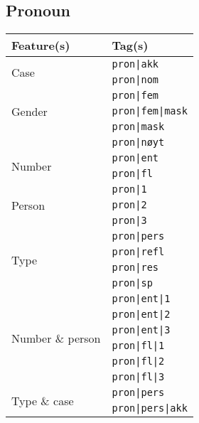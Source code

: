 \documentclass[a4paper,12pt,english]{book}
\begin{document}
\begin{appendices}
    \section{Pronoun}
    \begin{table}
        \centering
        \smaller[1.5]
        \begin{tabular}{@{}ll@{}}
            \toprule
            \textbf{Feature(s)} & \textbf{Tag(s)} \\
            \midrule
            \multirow{2}{*}{Case}
            & \texttt{pron|akk} \\
            & \texttt{pron|nom} \\
            \midrule
            \multirow{3}{*}{Gender}
            & \texttt{pron|fem} \\
            & \texttt{pron|fem|mask} \\
            & \texttt{pron|mask} \\
            & \texttt{pron|nøyt} \\
            \midrule
            \multirow{2}{*}{Number}
            & \texttt{pron|ent} \\
            & \texttt{pron|fl} \\
            \midrule
            \multirow{3}{*}{Person}
            & \texttt{pron|1} \\
            & \texttt{pron|2} \\
            & \texttt{pron|3} \\
            \midrule
            \multirow{4}{*}{Type}
            & \texttt{pron|pers} \\
            & \texttt{pron|refl} \\
            & \texttt{pron|res} \\
            & \texttt{pron|sp} \\
            \midrule
            \multirow{6}{*}{Number \& person}
            & \texttt{pron|ent|1} \\
            & \texttt{pron|ent|2} \\
            & \texttt{pron|ent|3} \\
            & \texttt{pron|fl|1} \\
            & \texttt{pron|fl|2} \\
            & \texttt{pron|fl|3} \\
            \midrule
            \multirow{6}{*}{Type \& case}
            & \texttt{pron|pers} \\
            & \texttt{pron|pers|akk} \\

\end{tabular}
\end{table}
\end{appendices}
\end{document}
